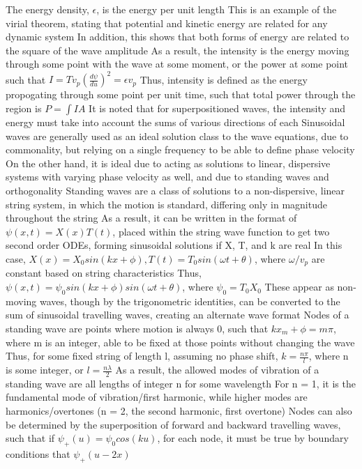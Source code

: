 \documentclass[11 pt, twoside]{article}
\newenvironment{outline*}
{
	\begin{outline}[enumerate]
	}
	{\end{outline}
}
\begin{document}
\begin{outline*}
\2 The energy density, $\epsilon$, is the energy per unit length
\2 This is an example of the virial theorem, stating that potential and kinetic energy are related for any dynamic system
\3 In addition, this shows that both forms of energy are related to the square of the wave amplitude
\2 As a result, the intensity is the energy moving through some point with the wave at some moment, or the power at some point such that $I = Tv_p(\frac{d\psi}{du})^2 = \epsilon v_p$
\3 Thus, intensity is defined as the energy propogating through some point per unit time, such that total power through the region is $P = \int IA$
\2 It is noted that for superpositioned waves, the intensity and energy must take into account the sums of various directions of each
\1 Sinusoidal waves are generally used as an ideal solution class to the wave equations, due to commonality, but relying on a single frequency to be able to define phase velocity
\2 On the other hand, it is ideal due to acting as solutions to linear, dispersive systems with varying phase velocity as well, and due to standing waves and orthogonality
\1 Standing waves are a class of solutions to a non-dispersive, linear string system, in which the motion is standard, differing only in magnitude throughout the string
\2 As a result, it can be written in the format of $\psi(x, t) = X(x)T(t)$, placed within the string wave function to get two second order ODEs, forming sinusoidal solutions if X, T, and k are real
\2 In this case, $X(x) = X_0sin(kx + \phi), T(t) = T_0sin(\omega t + \theta)$, where $\omega/v_p$ are constant based on string characteristics
\3 Thus, $\psi(x, t) = \psi_0 sin(kx + \phi)sin(\omega t + \theta)$, where $\psi_0 = T_0X_0$
\2 These appear as non-moving waves, though by the trigonometric identities, can be converted to the sum of sinusoidal travelling waves, creating an alternate wave format
\2 Nodes of a standing wave are points where motion is always 0, such that $kx_m + \phi = m\pi$, where m is an integer, able to be fixed at those points without changing the wave
\3 Thus, for some fixed string of length l, assuming no phase shift, $k = \frac{n\pi}{l}$, where n is some integer, or $l = \frac{n\lambda}{2}$
\3 As a result, the allowed modes of vibration of a standing wave are all lengths of integer n for some wavelength
\4 For n = 1, it is the fundamental mode of vibration/first harmonic, while higher modes are harmonics/overtones (n = 2, the second harmonic, first overtone)
\3 Nodes can also be determined by the superposition of forward and backward travelling waves, such that if $\psi_+(u) = \psi_0 cos(ku)$, for each node, it must be true by boundary conditions that $\psi_+(u - 2x)$

\end{outline*}
\end{document}

